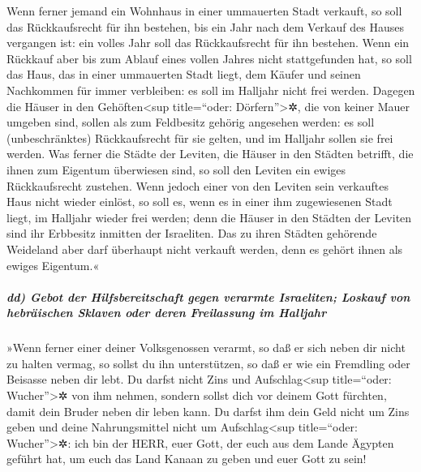 Wenn ferner jemand ein Wohnhaus in einer ummauerten Stadt
verkauft, so soll das Rückkaufsrecht für ihn bestehen, bis ein Jahr nach
dem Verkauf des Hauses vergangen ist: ein volles Jahr soll das
Rückkaufsrecht für ihn bestehen. Wenn ein Rückkauf aber
bis zum Ablauf eines vollen Jahres nicht stattgefunden hat, so soll das
Haus, das in einer ummauerten Stadt liegt, dem Käufer und seinen
Nachkommen für immer verbleiben: es soll im Halljahr nicht frei werden.
Dagegen die Häuser in den Gehöften\textless sup
title=``oder: Dörfern''\textgreater✲, die von keiner Mauer umgeben sind,
sollen als zum Feldbesitz gehörig angesehen werden: es soll
(unbeschränktes) Rückkaufsrecht für sie gelten, und im Halljahr sollen
sie frei werden. Was ferner die Städte der Leviten, die
Häuser in den Städten betrifft, die ihnen zum Eigentum überwiesen sind,
so soll den Leviten ein ewiges Rückkaufsrecht zustehen.
Wenn jedoch einer von den Leviten sein verkauftes Haus
nicht wieder einlöst, so soll es, wenn es in einer ihm zugewiesenen
Stadt liegt, im Halljahr wieder frei werden; denn die Häuser in den
Städten der Leviten sind ihr Erbbesitz inmitten der Israeliten.
Das zu ihren Städten gehörende Weideland aber darf
überhaupt nicht verkauft werden, denn es gehört ihnen als ewiges
Eigentum.«

\hypertarget{dd-gebot-der-hilfsbereitschaft-gegen-verarmte-israeliten-loskauf-von-hebruxe4ischen-sklaven-oder-deren-freilassung-im-halljahr}{%
\subparagraph{dd) Gebot der Hilfsbereitschaft gegen verarmte Israeliten;
Loskauf von hebräischen Sklaven oder deren Freilassung im
Halljahr}\label{dd-gebot-der-hilfsbereitschaft-gegen-verarmte-israeliten-loskauf-von-hebruxe4ischen-sklaven-oder-deren-freilassung-im-halljahr}}

»Wenn ferner einer deiner Volksgenossen verarmt, so daß
er sich neben dir nicht zu halten vermag, so sollst du ihn unterstützen,
so daß er wie ein Fremdling oder Beisasse neben dir lebt.
Du darfst nicht Zins und Aufschlag\textless sup
title=``oder: Wucher''\textgreater✲ von ihm nehmen, sondern sollst dich
vor deinem Gott fürchten, damit dein Bruder neben dir leben kann.
Du darfst ihm dein Geld nicht um Zins geben und deine
Nahrungsmittel nicht um Aufschlag\textless sup title=``oder:
Wucher''\textgreater✲: ich bin der HERR, euer Gott, der
euch aus dem Lande Ägypten geführt hat, um euch das Land Kanaan zu geben
und euer Gott zu sein!

